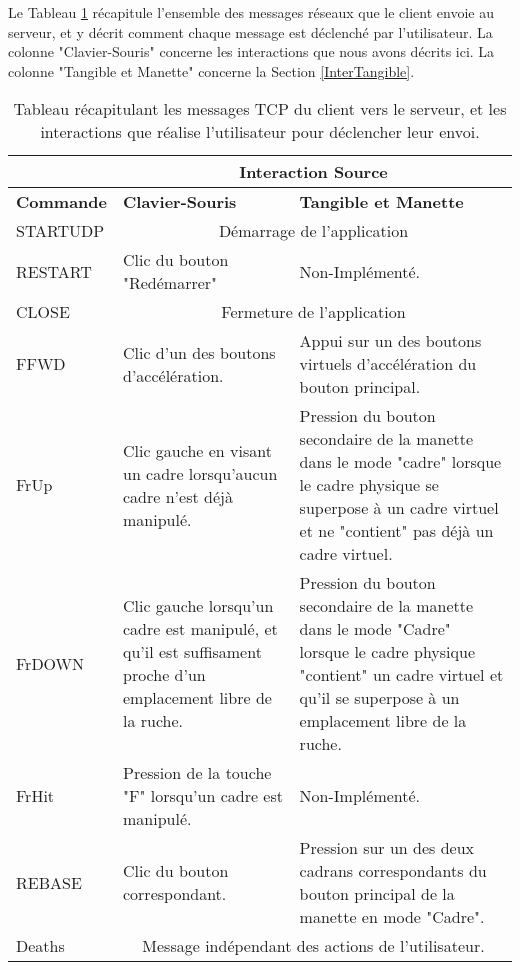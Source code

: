 		 Le Tableau \ref{tabTotalInterClient} récapitule l'ensemble des messages réseaux que le client envoie au serveur, et y décrit comment chaque message est déclenché par l'utilisateur. La colonne "Clavier-Souris" concerne les interactions que nous avons décrits ici. La colonne "Tangible et Manette" concerne la Section \ref{InterTangible}.
	
	\begin{table}
		\begin{tabularx}{\textwidth}{|l|p{4.5cm}|X|}
		\hline
		 & \multicolumn{2}{c|}{\textbf{Interaction Source}}\\
		 \hline
		 \textbf{Commande} & \textbf{Clavier-Souris} & \textbf{Tangible et Manette}\\
		 \hline
		 STARTUDP & \multicolumn{2}{c|}{Démarrage de l'application}\\
		 \hline
		 RESTART & Clic du bouton "Redémarrer" & Non-Implémenté.\\
		 \hline
		 CLOSE & \multicolumn{2}{c|}{Fermeture de l'application}\\
		 \hline
		 FFWD & Clic d'un des boutons d'accélération. & Appui sur un des boutons virtuels d'accélération du bouton principal.\\
		 \hline
		 FrUp & Clic gauche en visant un cadre lorsqu'aucun cadre n'est déjà manipulé. & Pression du bouton secondaire de la manette dans le mode "cadre" lorsque le cadre physique se superpose à un cadre virtuel et ne "contient" pas déjà un cadre virtuel.\\
		 \hline
		 FrDOWN & Clic gauche lorsqu'un cadre est manipulé, et qu'il est suffisament proche d'un emplacement libre de la ruche. & Pression du bouton secondaire de la manette dans le mode "Cadre" lorsque le cadre physique "contient" un cadre virtuel et qu'il se superpose à un emplacement libre de la ruche.\\
		 \hline
		 FrHit & Pression de la touche "F" lorsqu'un cadre est manipulé. & Non-Implémenté.\\
		 \hline
		 REBASE & Clic du bouton correspondant. & Pression sur un des deux cadrans correspondants du bouton principal de la manette en mode "Cadre".\\
		 \hline
		 Deaths & \multicolumn{2}{c|}{Message indépendant des actions de l'utilisateur.}\\
		 \hline 
		\end{tabularx}
	\caption{Tableau récapitulant les messages TCP du client vers le serveur, et les interactions que réalise l'utilisateur pour déclencher leur envoi.}
	\label{tabTotalInterClient}
	\end{table}
		
